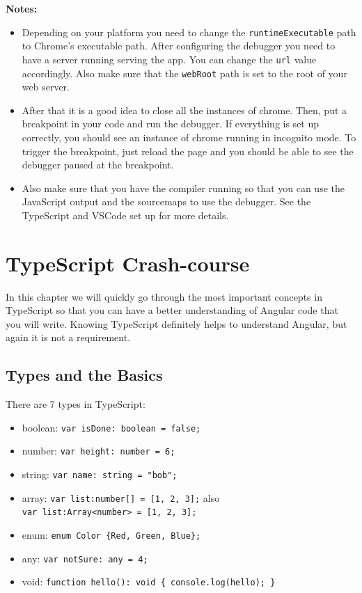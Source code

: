 \documentclass[12pt,]{article}
\providecommand{\tightlist}{%
  \setlength{\itemsep}{0pt}\setlength{\parskip}{0pt}}
\begin{document}
\textbf{Notes:}

\begin{itemize}
\item
  Depending on your platform you need to change the
  \texttt{runtimeExecutable} path to Chrome's executable path. After
  configuring the debugger you need to have a server running serving the
  app. You can change the \texttt{url} value accordingly. Also make sure
  that the \texttt{webRoot} path is set to the root of your web server.
\item
  After that it is a good idea to close all the instances of chrome.
  Then, put a breakpoint in your code and run the debugger. If
  everything is set up correctly, you should see an instance of chrome
  running in incognito mode. To trigger the breakpoint, just reload the
  page and you should be able to see the debugger paused at the
  breakpoint.
\item
  Also make sure that you have the compiler running so that you can use
  the JavaScript output and the sourcemaps to use the debugger. See the
  TypeScript and VSCode set up for more details.
\end{itemize}

\section{TypeScript Crash-course}\label{typescript-crash-course}

In this chapter we will quickly go through the most important concepts
in TypeScript so that you can have a better understanding of Angular
code that you will write. Knowing TypeScript definitely helps to
understand Angular, but again it is not a requirement.

\subsection{Types and the Basics}\label{types-and-the-basics}

There are 7 types in TypeScript:

\begin{itemize}
\tightlist
\item
  boolean: \texttt{var\ isDone:\ boolean\ =\ false;}
\item
  number: \texttt{var\ height:\ number\ =\ 6;}
\item
  string: \texttt{var\ name:\ string\ =\ "bob";}
\item
  array: \texttt{var\ list:number{[}{]}\ =\ {[}1,\ 2,\ 3{]};} also
  \texttt{var\ list:Array\textless{}number\textgreater{}\ =\ {[}1,\ 2,\ 3{]};}
\item
  enum: \texttt{enum\ Color\ \{Red,\ Green,\ Blue\};}
\item
  any: \texttt{var\ notSure:\ any\ =\ 4;}
\item
  void:
  \texttt{function\ hello():\ void\ \{\ console.log(\textquotesingle{}hello\textquotesingle{});\ \}}
\end{itemize}
\end{document}
